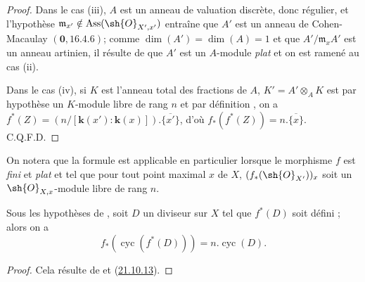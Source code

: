 \begin{proof}
Dans le cas (iii), $A$ est un anneau de valuation discrète, donc régulier, et l'hypothèse $\mathfrak{m}_{x'}\notin\operatorname{Ass}(\sh{O}_{X',x'})$ entraîne que $A'$ est un anneau de Cohen-Macaulay $(\mathbf{0},16.4.6)$;
comme $\dim(A')=\dim(A)=1$ et que $A'/\mathfrak{m}_xA'$ est un anneau artinien, il résulte de  que $A'$ est un $A$-module \emph{plat} et on est ramené au cas (ii).

Dans le cas (iv), si $K$ est l'anneau total des fractions de $A$, $K'=A'\otimes_AK$ est par hypothèse un $K$-module libre de rang $n$ et par définition , on a
$f^*(Z)=(n/[\boldsymbol{k}(x'): \boldsymbol{k}(x)]).\overline{\{x'\}}$,
d'où $f_*(f^*(Z))=n.\overline{\{x\}}$. C.Q.F.D.
\end{proof}

On notera que la formule  est applicable en particulier lorsque le morphisme $f$ est \emph{fini} et \emph{plat} et tel que pour tout point maximal $x$ de $X$, $(f_*(\sh{O}_{X'}))_x$ soit un $\sh{O}_{X,x}$-module libre de rang $n$.

\begin{corollary}[21.10.19]
\label{IV.21.10.19}
Sous les hypothèses de , soit $D$ un diviseur sur $X$ tel que $f^*(D)$ soit défini ; alors on a
\[
\label{IV.21.10.19.1}
  f_*(\operatorname{cyc}(f^*(D)))=n.\operatorname{cyc}(D).
  \tag{21.10.19.1}
\]
\end{corollary}

\begin{proof}
Cela résulte de  et (\hyperref[IV.21.10.13bis]{21.10.13}).
\end{proof}
